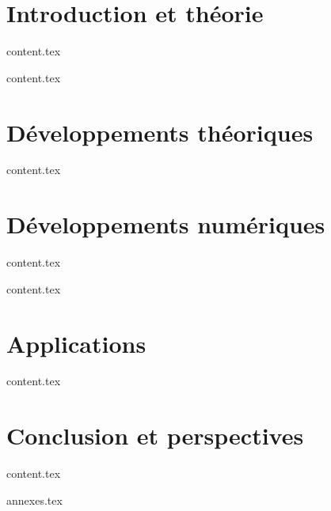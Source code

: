 \documentclass{bredele}
\begin{document}
\clearemptydoublepage
\mainmatter

\part{Introduction et théorie}

\clearemptydoublepage
{content.tex}

\clearemptydoublepage
{content.tex}

\part{Développements théoriques}

\clearemptydoublepage
{content.tex}

\part{Développements numériques}

\clearemptydoublepage
{content.tex}


\clearemptydoublepage
{content.tex}

\part{Applications}

\clearemptydoublepage
{content.tex}


\part{Conclusion et perspectives}


\clearemptydoublepage
{content.tex}



\clearemptydoublepage
\renewcommand{\thesubsection}{\Alph{chapter}}
{annexes.tex}


\clearemptydoublepage
\backmatter
\printbibliography

\tikzexternaldisable
\end{document}
